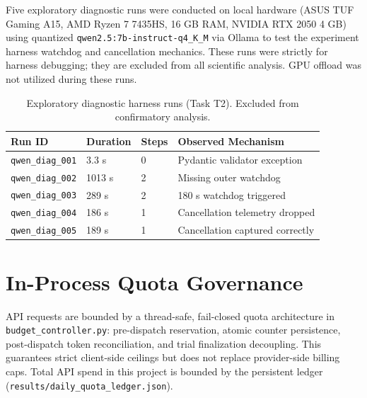 \documentclass[conference]{IEEEtran}
\begin{document}
Five exploratory diagnostic runs were conducted on local hardware (ASUS TUF Gaming A15, AMD Ryzen 7 7435HS, 16 GB RAM, NVIDIA RTX 2050 4 GB) using quantized \texttt{qwen2.5:7b-instruct-q4\_K\_M} via Ollama to test the experiment harness watchdog and cancellation mechanics. These runs were strictly for harness debugging; they are excluded from all scientific analysis. GPU offload was not utilized during these runs.

\begin{table}[t]
\centering
\footnotesize
\caption{Exploratory diagnostic harness runs (Task T2). Excluded from confirmatory analysis.}
\label{tab:qwen_runs}
\begin{tabular}{llll}
\toprule
\textbf{Run ID} & \textbf{Duration} & \textbf{Steps} & \textbf{Observed Mechanism} \\
\midrule
\texttt{qwen\_diag\_001} & 3.3 s    & 0 & Pydantic validator exception \\
\texttt{qwen\_diag\_002} & 1013 s   & 2 & Missing outer watchdog \\
\texttt{qwen\_diag\_003} & 289 s    & 2 & 180 s watchdog triggered \\
\texttt{qwen\_diag\_004} & 186 s    & 1 & Cancellation telemetry dropped \\
\texttt{qwen\_diag\_005} & 189 s    & 1 & Cancellation captured correctly \\
\bottomrule
\end{tabular}
\end{table}

\FloatBarrier

\section{In-Process Quota Governance}
\label{app:quota}

API requests are bounded by a thread-safe, fail-closed quota architecture in \texttt{budget\_controller.py}: pre-dispatch reservation, atomic counter persistence, post-dispatch token reconciliation, and trial finalization decoupling. This guarantees strict client-side ceilings but does not replace provider-side billing caps. Total API spend in this project is bounded by the persistent ledger (\texttt{results/daily\_quota\_ledger.json}).
\end{document}
